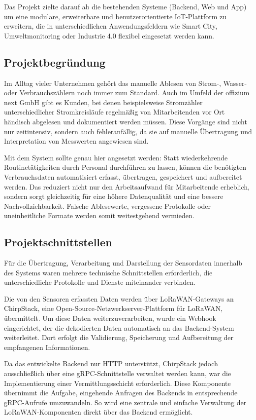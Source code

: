 	Das Projekt zielte darauf ab die bestehenden Systeme (\dahe Backend, Web und App) um eine modulare,
	erweiterbare und benutzerorientierte \ac{IoT}-Plattform zu erweitern,
	die in unterschiedlichen Anwendungsfeldern wie Smart City, Umweltmonitoring oder Industrie 4.0 flexibel eingesetzt werden kann.


\subsection{Projektbegründung} 
\label{sec:Projektbegruendung}
	Im Alltag vieler Unternehmen gehört das manuelle Ablesen von Strom-, Wasser- oder Verbrauchszählern noch immer zum Standard.
	Auch im Umfeld der offizium next GmbH gibt es Kunden, bei denen beispielsweise Stromzähler unterschiedlicher Stromkreisläufe
	regelmäßig von Mitarbeitenden vor Ort händisch abgelesen und dokumentiert werden müssen.
	Diese Vorgänge sind nicht nur zeitintensiv, sondern auch fehleranfällig,
	da sie auf manuelle Übertragung und Interpretation von Messwerten angewiesen sind.

	Mit dem System \SCO sollte genau hier angesetzt werden:
	Statt wiederkehrende Routinetätigkeiten durch Personal durchführen zu lassen,
	können die benötigten Verbrauchsdaten automatisiert erfasst, übertragen, gespeichert und aufbereitet werden.
	Das reduziert nicht nur den Arbeitsaufwand für Mitarbeitende erheblich,
	sondern sorgt gleichzeitig für eine höhere Datenqualität und eine bessere Nachvollziehbarkeit.
	Falsche Ablesewerte, vergessene Protokolle oder uneinheitliche Formate werden somit weitestgehend vermieden.


\subsection{Projektschnittstellen} 
\label{sec:Projektschnittstellen}
	Für die Übertragung, Verarbeitung und Darstellung der Sensordaten innerhalb des Systems waren mehrere technische Schnittstellen erforderlich,
	die unterschiedliche Protokolle und Dienste miteinander verbinden.
	
	Die von den Sensoren erfassten Daten werden über LoRaWAN-Gateways an ChirpStack, eine Open-Source-Netzwerkserver-Plattform für LoRaWAN, übermittelt. 
	Um diese Daten weiterzuverarbeiten, wurde ein Webhook eingerichtet, der die dekodierten Daten automatisch an das Backend-System weiterleitet. 
	Dort erfolgt die Validierung, Speicherung und Aufbereitung der empfangenen Informationen.
	
	Da das entwickelte Backend nur \ac{HTTP} unterstützt, ChirpStack jedoch ausschließlich über eine gRPC-Schnittstelle verwaltet werden kann,
	war die Implementierung einer Vermittlungsschicht erforderlich.
	Diese Komponente übernimmt die Aufgabe, eingehende Anfragen des Backends in entsprechende gRPC-Aufrufe umzuwandeln.
	So wird eine zentrale und einfache Verwaltung der LoRaWAN-Komponenten direkt über das Backend ermöglicht.
	
